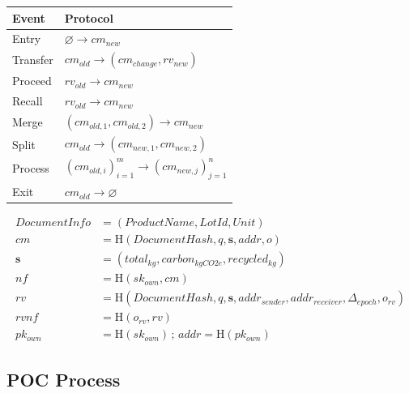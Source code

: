 \documentclass[11pt,a4paper]{extarticle}
\newcommand{\Hash}{\mathrm{H}}
\begin{document}
\begin{center}
  \begin{tabular}{ll}
    \hline
    Event    & Protocol                                        \\
    \hline
    Entry    & $\varnothing\rightarrow cm_{new}$                         \\
    Transfer & $cm_{old}\rightarrow (cm_{change},rv_{new})$              \\
    Proceed  & $rv_{old}\rightarrow cm_{new}$                            \\
    Recall   & $rv_{old}\rightarrow cm_{new}$                            \\
    Merge    & $(cm_{old,1},cm_{old,2})\rightarrow cm_{new}$             \\
    Split    & $cm_{old}\rightarrow (cm_{new,1},cm_{new,2})$             \\
    Process  & $(cm_{old,i})_{i=1}^{m}\rightarrow(cm_{new,j})_{j=1}^{n}$ \\
    Exit     & $cm_{old}\rightarrow\varnothing$                          \\
    \hline
  \end{tabular}
\end{center}

\[
  \begin{aligned}
    \mathit{DocumentInfo}
     & = (ProductName,LotId,Unit)                         \\[5pt]
    cm
     & = \Hash(\mathit{DocumentHash},q,\mathbf{s},addr,o) \\
    \mathbf{s}
     & = (total_{kg},carbon_{kgCO2e},recycled_{kg})       \\[5pt]
    nf
     & = \Hash(sk_{own},cm)                               \\[5pt]
    rv
     & = \Hash(
    \mathit{DocumentHash},q,\mathbf{s},
    addr_{sender},addr_{receiver},\Delta_{epoch},o_{rv}
    )                                                     \\[5pt]
    rvnf
     & = \Hash(o_{rv},rv)                                 \\[5pt]
    pk_{own}
     & = \Hash(sk_{own})
    \,;\,
    addr=\Hash(pk_{own})
  \end{aligned}
\]

\subsection*{POC Process}
\end{document}
